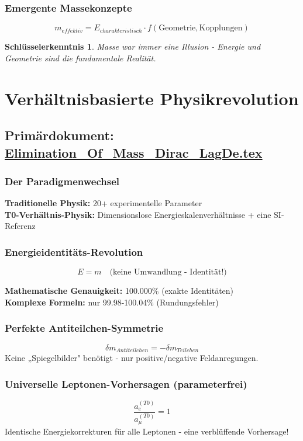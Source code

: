 \documentclass[12pt,a4paper]{report}
\newtheorem{insight}{Schlüsselerkenntnis}[chapter]
\begin{document}
	\subsubsection{Emergente Massekonzepte}
	$$m_{effektiv} = E_{charakteristisch} \cdot f(\text{Geometrie}, \text{Kopplungen})$$
	
	\begin{insight}
		Masse war immer eine Illusion - Energie und Geometrie sind die fundamentale Realität.
	\end{insight}
	
	\section{Verhältnisbasierte Physikrevolution}
	\subsection{Primärdokument: \href{https://github.com/jpascher/T0-Time-Mass-Duality/tree/main/2/pdf/Elimination_Of_Mass_Dirac_LagDe.pdf}{Elimination\_Of\_Mass\_Dirac\_LagDe.tex}}
	
	\subsubsection{Der Paradigmenwechsel}
	\textbf{Traditionelle Physik:} 20+ experimentelle Parameter\\
	\textbf{T0-Verhältnis-Physik:} Dimensionslose Energieskalenverhältnisse + eine SI-Referenz
	
	\subsubsection{Energieidentitäts-Revolution}
	$$E = m \quad \text{(keine Umwandlung - Identität!)}$$
	
	\textbf{Mathematische Genauigkeit:} 100.000\% (exakte Identitäten)\\
	\textbf{Komplexe Formeln:} nur 99.98-100.04\% (Rundungsfehler)
	
	\subsubsection{Perfekte Antiteilchen-Symmetrie}
	$$\delta m_{Antiteilchen} = -\delta m_{Teilchen}$$
	Keine „Spiegelbilder" benötigt - nur positive/negative Feldanregungen.
	
	\subsubsection{Universelle Leptonen-Vorhersagen (parameterfrei)}
	$$\frac{a_e^{(T0)}}{a_\mu^{(T0)}} = 1$$
	Identische Energiekorrekturen für alle Leptonen - eine verblüffende Vorhersage!
	
\end{document}

